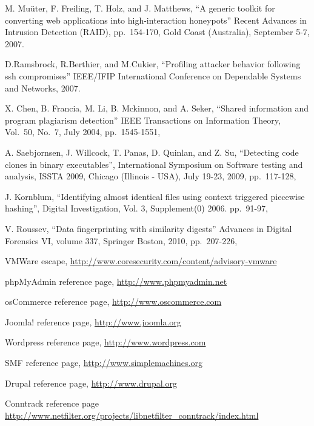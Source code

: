 \begin{thebibliography}{99}
M. Muüter, F. Freiling, T. Holz, and J. Matthews,
``A generic toolkit for converting web applications into high-interaction honeypots''
Recent Advances in Intrusion Detection (RAID),
pp.\ 154-170,
Gold Coast (Australia), September 5-7, 2007.

D.Ramsbrock, R.Berthier, and M.Cukier,
``Profiling attacker behavior following ssh compromises''
IEEE/IFIP International Conference on Dependable Systems and Networks, 2007.

X. Chen, B. Francia, M. Li, B. Mckinnon, and A. Seker,
``Shared information and program plagiarism detection''
IEEE Transactions on Information Theory,
Vol.\ 50, No.\ 7,
July 2004,
pp.\ 1545-1551,

A. Saebjornsen, J. Willcock, T. Panas, D. Quinlan, and Z. Su,
``Detecting code clones in binary executables'',
International Symposium on Software testing and analysis, ISSTA 2009,
 Chicago (Illinois - USA), July 19-23, 2009,
pp.\ 117-128,

J. Kornblum,
``Identifying almost identical files using context triggered piecewise hashing'',
Digital Investigation,
Vol. 3, Supplement(0)
2006.
pp.\ 91-97,

V. Roussev,
``Data fingerprinting with similarity digests''
Advances in Digital Forensics VI, volume 337,
Springer Boston, 2010,
pp.\ 207-226,

VMWare escape, %
\url{http://www.coresecurity.com/content/advisory-vmware} %

phpMyAdmin reference page,
\url{http://www.phpmyadmin.net}

osCommerce reference page,
\url{http://www.oscommerce.com}

Joomla! reference page,
\url{http://www.joomla.org}

Wordpress reference page,
\url{http://www.wordpress.com}

SMF reference page,
\url{http://www.simplemachines.org}

Drupal reference page,
\url{http://www.drupal.org}

Conntrack reference page
\url{http://www.netfilter.org/projects/libnetfilter_conntrack/index.html}


\end{thebibliography}
